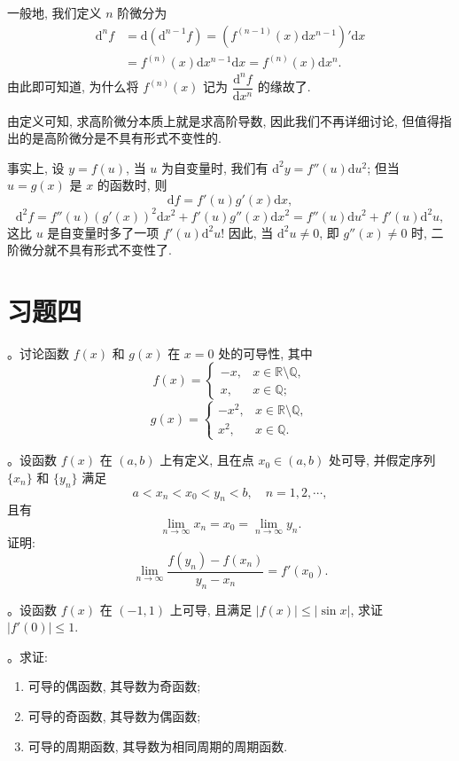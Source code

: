 一般地, 我们定义 $n$ 阶微分为
\[
\begin{aligned}
  \mathrm d^nf
  &=
  \mathrm d(\mathrm d^{n-1}f)
  =
  (f^{(n-1)}(x)\mathrm dx^{n-1})'\mathrm dx  \\
  &=
  f^{(n)}(x)\mathrm dx^{n-1}\mathrm dx
  =
  f^{(n)}(x)\mathrm dx^n.
\end{aligned}
\]
由此即可知道, 为什么将 $f^{(n)}(x)$ 记为 $\dfrac{\mathrm d^nf}{\mathrm dx^n}$ 的缘故了.

由定义可知, 求高阶微分本质上就是求高阶导数, 因此我们不再详细讨论, 但值得指出的是高阶微分是不具有形式不变性的.

事实上, 设 $y=f(u)$, 当 $u$ 为自变量时, 我们有 $\mathrm d^2y=f''(u)\mathrm du^2$; 但当 $u=g(x)$ 是 $x$ 的函数时, 则
\[
  \mathrm df=f'(u)g'(x)\mathrm dx,
\]
\[
  \mathrm d^2f
  =
  f''(u)(g'(x))^2\mathrm dx^2+f'(u)g''(x)\mathrm dx^2
  =
  f''(u)\mathrm du^2+f'(u)\mathrm d^2u,
\]
这比 $u$ 是自变量时多了一项 $f'(u)\mathrm d^2u$! 因此, 当 $\mathrm d^2u\ne0$, 即 $g''(x)\ne0$ 时, 二阶微分就不具有形式不变性了.

\section*{习题四}
{}
\label{exercises:ma-4}

。讨论函数 $f(x)$ 和 $g(x)$ 在 $x=0$ 处的可导性, 其中
\[
  f(x)=
  \begin{cases}
    -x, & x\in\mathbb R\setminus\mathbb Q,\\
    x, & x\in\mathbb Q;
  \end{cases}
\]
\[
  g(x)=
  \begin{cases}
    -x^2, & x\in\mathbb R\setminus\mathbb Q,\\
    x^2, & x\in\mathbb Q.
  \end{cases}
\]

。设函数 $f(x)$ 在 $(a,b)$ 上有定义, 且在点 $x_0\in(a,b)$ 处可导, 并假定序列 $\{x_n\}$ 和 $\{y_n\}$ 满足
\[
  a<x_n<x_0<y_n<b,\quad n=1,2,\cdots,
\]
且有
\[
  \lim_{n\to\infty}x_n=x_0=\lim_{n\to\infty}y_n.
\]
证明:
\[
  \lim_{n\to\infty}\frac{f(y_n)-f(x_n)}{y_n-x_n}=f'(x_0).
\]

。设函数 $f(x)$ 在 $(-1,1)$ 上可导, 且满足 $|f(x)|\leqslant|\sin x|$, 求证 $|f'(0)|\leqslant1$.

。求证:
\begin{enumerate}
  \item 可导的偶函数, 其导数为奇函数;
  \item 可导的奇函数, 其导数为偶函数;
  \item 可导的周期函数, 其导数为相同周期的周期函数.
\end{enumerate}

